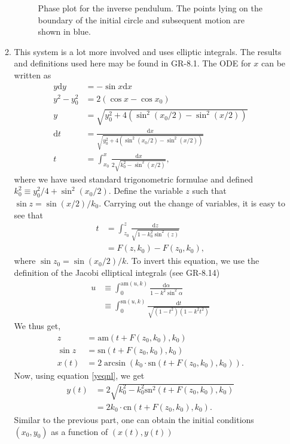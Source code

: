 \begin{enumerate}
\begin{enumerate}
\begin{figure}[!h]
	\caption{Phase plot for the inverse pendulum. The points lying on the boundary of the initial circle and subsequent motion are shown in blue.}
	\label{invp}
\end{figure}
\item This system is a lot more involved and uses elliptic integrals. The results and definitions used here may be found in GR-8.1. The ODE for $x$ can be written as 
\begin{align}
	y\mathrm{d}y & = -\sin x \mathrm{d}x\\
	y^2-y_0^2 &= 2(\cos x-\cos x_0)\label{yeqnl}\\
	y & = \sqrt{y_0^2 + 4(\sin ^2 (x_0/2)-\sin ^2 (x/2))}\\
	\mathrm{d}t & = \frac{\mathrm{d}x}{\sqrt{y_0^2 + 4(\sin ^2 (x_0/2)-\sin ^2 (x/2))}}\\
	t& = \int_{x_0}^{x}\frac{\mathrm{d}x}{2\sqrt{k_0^2-\sin^2(x/2)}},
\end{align}
where we have used standard trigonometric formulae and defined $k_0^2 \equiv y_0^2/4 + \sin^2(x_0/2)$. Define the variable $z$ such that $\sin z = \sin(x/2)/k_0$. Carrying out the change of variables, it is easy to see that
\begin{align}
	t & = \int_{z_0}^{z}\frac{\mathrm{d}z}{\sqrt{1-k_0^2\sin^2(z)}}\\
	&= F(z,k_0) - F(z_0,k_0),
\end{align}
where $ \sin z_0 = \sin(x_0/2)/k $. To invert this equation, we use the definition of the Jacobi elliptical integrals (see GR-8.14)\begin{align}\label{key}
	u &\equiv \int_0^{\mathrm{am} (u,k)}\frac{\mathrm{d}\alpha}{1-k^2\sin^2\alpha}\\
	&\equiv \int_0^{\mathrm{sn}(u,k)}\frac{\mathrm{d}t}{\sqrt{(1-t^2)(1-k^2t^2)}}
\end{align}
We thus get,\begin{align}\label{key}
	z &= \mathrm{am}(t + F(z_0,k_0),k_0)\\
	\sin z & = 	\mathrm{sn}(t + F(z_0,k_0),k_0)\\
	x(t)& = 2\arcsin(k_0 \cdot \mathrm{sn}(t + F(z_0,k_0),k_0)).
\end{align}
Now, using equation \eqref{yeqnl}, we get
\begin{align}
	y(t) &= 2\sqrt{k_0^2 - k_0^2 \mathrm{sn}^2(t + F(z_0,k_0),k_0)}\\
	& = 2 k_0 \cdot\mathrm{cn}(t + F(z_0,k_0),k_0).
\end{align}
Similar to the previous part, one can obtain the initial conditions $(x_0,y_0)$ as a function of $(x(t),y(t))$

\end{enumerate}
\end{enumerate}
